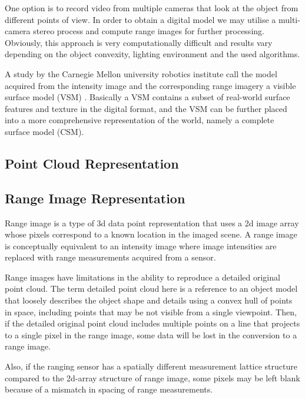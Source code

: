 \documentclass[12pt,a4paper,oneside,pdftex]{report}
\begin{document}
One option is to record video from multiple cameras that look at the object from different points of view. In order to obtain a digital model we may utilise a multi-camera stereo process and compute range images for further processing. Obviously, this approach is very computationally difficult and results vary depending on the object convexity, lighting environment and the used algorithms.  

A study by the Carnegie Mellon university robotics institute call the model acquired from the intensity image and the corresponding range imagery a visible surface model (VSM) \cite{Rander97}. Basically a VSM contains a subset of real-world surface features and texture in the digital format, and the VSM can be further placed into a more comprehensive representation of the world, namely a complete surface model (CSM). 

\subsection{Point Cloud Representation}
\label{subsection:point_cloud_representation}


\subsection{Range Image Representation}
\label{subsection:range_image_representation}

Range image is a type of 3d data point representation that uses a 2d image array whose pixels correspond to a known location in the imaged scene. A range image is conceptually equivalent to an intensity image where image intensities are replaced with range measurements acquired from a sensor.

Range images have limitations in the ability to reproduce a detailed original point cloud. The term detailed point cloud here is a reference to an object model that loosely describes the object shape and details using a convex hull of points in space, including points that may be not visible from a single viewpoint. Then, if the detailed original point cloud includes multiple points on a line that projects to a single pixel in the range image, some data will be lost in the conversion to a range image. 

Also, if the ranging sensor has a spatially different measurement lattice structure compared to the 2d-array structure of range image, some pixels may be left blank because of a mismatch in spacing of range measurements.
\end{document}
